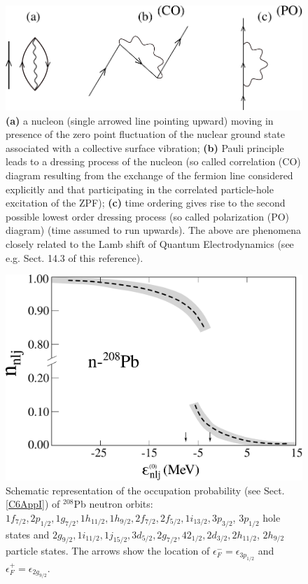 \begin{figure}
	\centerline {
		\includegraphics*[width=12cm]{introduccion/figs/figpreface8}
	}
	\caption{\textbf{(a)} a nucleon (single arrowed line pointing upward) moving in presence of the zero point fluctuation of the nuclear ground state associated with a collective surface vibration; \textbf{(b)} Pauli principle leads to a dressing process of the nucleon (so called correlation (CO) diagram resulting from the exchange of the fermion line considered explicitly and that participating in the correlated particle-hole excitation of the ZPF); \textbf{(c)} time ordering gives rise to the second possible lowest order dressing  process (so called polarization (PO) diagram)  (time assumed to run upwards). The above are phenomena closely related to the Lamb shift of Quantum Electrodynamics (see e.g. \cite{Weinberg:96} Sect. 14.3 of this reference).}
	\label{fig1.0.8}
\end{figure}
\begin{figure}
	\centerline {
		\includegraphics*[width=12cm]{introduccion/figs/fig1_2_5}
	}
	\caption{Schematic representation of the occupation probability (see Sect. \ref{C6AppI}) of $^{208}$Pb neutron orbits: $1f_{7/2},2p_{1/2},1g_{7/2},1h_{11/2},1h_{9/2},2f_{7/2},2f_{5/2},1i_{13/2},3p_{3/2}$,  $3p_{1/2}$ hole states and $2g_{9/2},1i_{11/2},1j_{15/2},3d_{5/2},2g_{7/2},42_{1/2},2d_{3/2},2h_{11/2}$, $2h_{9/2}$ particle states. The arrows show the location of $\epsilon^-_F=\epsilon_{3p_{1/2}}$ and $\epsilon^+_F=\epsilon_{2g_{9/2}}$.}
	\label{fig1.2.5}
\end{figure}
